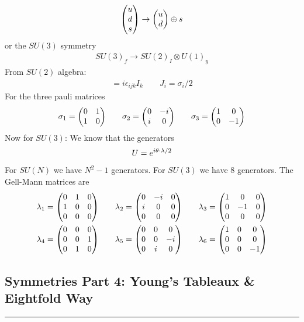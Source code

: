 \documentclass[../main.tex]{subfiles}
\begin{document}
\begin{align*}
    \mqty(u \\ d \\ s) \to \mqty(u \\ d) \oplus s
\end{align*}
or the $SU(3)$ symmetry
\begin{align*}
    SU(3)_f \to SU(2)_I \otimes U(1)_y
\end{align*}
From $SU(2)$ algebra:
\begin{align*}
    [J_i, J_j] = i \epsilon_{ijk} I_k \qquad J_i = \sigma_i / 2
\end{align*}
For the three pauli matrices
\begin{align*}
    \sigma_1 = \mqty(0 & 1 \\ 1 & 0) \qquad 
    \sigma_2 = \mqty(0 & -i \\ i & 0) \qquad
    \sigma_3 = \mqty(1 & 0 \\ 0 & -1)
\end{align*}
Now for $SU(3)$: We know that the generators
\begin{align*}
    U = e^{i \vb{\theta} \cdot \vb{\lambda}/2}
\end{align*}
For $SU(N)$ we have $N^2 - 1$ generators. For $SU(3)$ we have 8 generators. The Gell-Mann matrices
are 
\begin{align*}
    \lambda_1 &= \mqty(0 & 1 & 0 \\ 1 & 0 & 0 \\ 0 & 0 & 0) \qquad
    \lambda_2 = \mqty(0 & -i & 0 \\ i & 0 & 0 \\ 0 & 0 & 0) \qquad
    \lambda_3 = \mqty(1 & 0 & 0 \\ 0 & -1 & 0 \\ 0 & 0 & 0) \\
    \lambda_4 &= \mqty(0 & 0 & 0 \\ 0 & 0 & 1 \\ 0 & 1 & 0) \qquad
    \lambda_5 = \mqty(0 & 0 & 0 \\ 0 & 0 & -i \\ 0 & i & 0) \qquad
    \lambda_6 = \mqty(1 & 0 & 0 \\ 0 & 0 & 0 \\ 0 & 0 & -1)
\end{align*}

\newpage
{}

\subsection*{Symmetries Part 4: Young's Tableaux \& Eightfold Way}
\hrule \vspace{10px}
\end{document}
